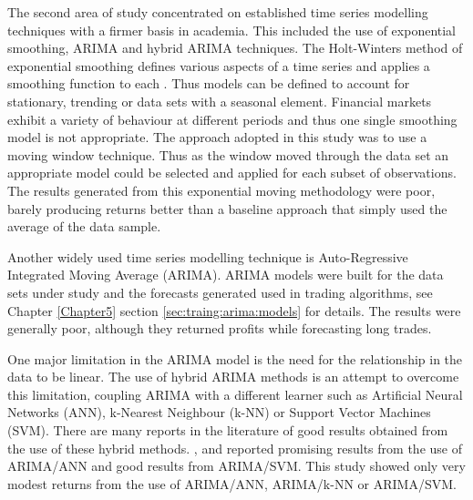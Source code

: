 The second area of study concentrated on established time series modelling techniques with a firmer basis in academia. This included the use of exponential smoothing, ARIMA and hybrid ARIMA techniques. The Holt-Winters method of exponential smoothing defines various aspects of a time series and applies a smoothing function to each \citep{Winters1960}. Thus models can be defined to account for stationary, trending or data sets with a seasonal element. Financial markets exhibit a variety of behaviour at different periods and thus one single smoothing model is not appropriate. The approach adopted in this study was to use a moving window technique. Thus as the window moved through the data set an appropriate model could be selected and applied for each subset of observations. The results generated from this exponential moving methodology were poor, barely producing returns better than a baseline approach that simply used the average of the data sample.

Another widely used time series modelling technique is Auto-Regressive Integrated Moving Average (ARIMA). ARIMA models were built for the data sets under study and the forecasts generated used in trading algorithms, see Chapter \ref{Chapter5} section \ref{sec:traing:arima:models} for details. The results were generally poor, although they returned profits while forecasting long trades. 

One major limitation in the ARIMA model is the need for the relationship in the data to be linear. The use of hybrid ARIMA methods is an attempt to overcome this limitation, coupling ARIMA with a different learner such as Artificial Neural Networks (ANN), k-Nearest Neighbour (k-NN) or Support Vector Machines (SVM). There are many reports in the literature of good results obtained from the use of these hybrid methods. \cite{Wang2012758}, \cite{Khashei2009956} and \cite{Zhang2003159} reported promising results from the use of ARIMA/ANN and \cite{Pai2005497} good results from ARIMA/SVM. This study showed only very modest returns from the use of ARIMA/ANN, ARIMA/k-NN or ARIMA/SVM.

